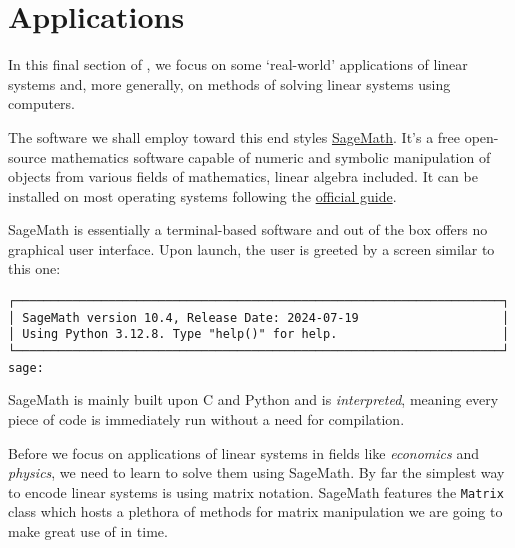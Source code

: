 \section{Applications}
\label{sec:applications}

In this final section of , we focus on some
`real-world' applications of linear systems and, more generally, on methods of
solving linear systems using computers.

The software we shall employ toward this end styles
\href{https://www.sagemath.org/}{SageMath}. It's a free open-source mathematics
software capable of numeric and symbolic manipulation of objects from various
fields of mathematics, linear algebra included. It can be installed on most
operating systems following the
\href{https://doc.sagemath.org/html/en/installation/index.html}{official guide}.

SageMath is essentially a terminal-based software and out of the box offers no
graphical user interface. Upon launch, the user is greeted by a screen similar
to this one:
\begin{Verbatim}
┌────────────────────────────────────────────────────────────────────┐
│ SageMath version 10.4, Release Date: 2024-07-19                    │
│ Using Python 3.12.8. Type "help()" for help.                       │
└────────────────────────────────────────────────────────────────────┘
sage:
\end{Verbatim}
SageMath is mainly built upon C and Python and is \emph{interpreted}, meaning
every piece of code is immediately run without a need for compilation.

Before we focus on applications of linear systems in fields like
\emph{economics} and \emph{physics}, we need to learn to solve them using
SageMath. By far the simplest way to encode linear systems is using matrix
notation. SageMath features the \texttt{Matrix} class which hosts a plethora of
methods for matrix manipulation we are going to make great use of in time.

